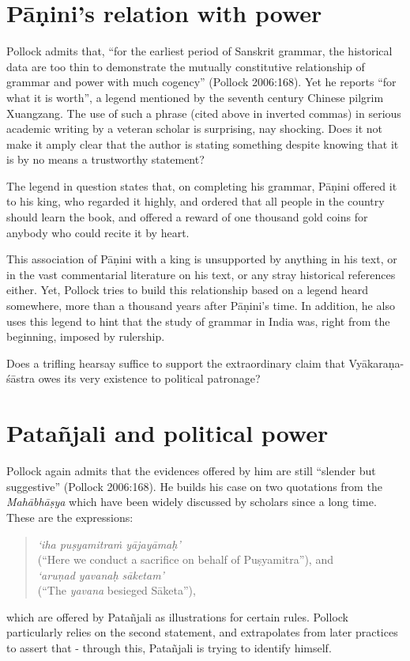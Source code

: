 \section{Pāṇini’s relation with power}\label{chap3-sec8}

Pollock admits that, ``for the earliest period of Sanskrit grammar, the historical data are too thin to demonstrate the mutually constitutive relationship of grammar and power with much cogency'' (Pollock 2006:168). Yet he reports ``for what it is worth'', a legend mentioned by the seventh century Chinese pilgrim Xuangzang. The use of such a phrase (cited above in inverted commas) in serious academic writing by a veteran scholar is surprising, nay shocking. Does it not make it amply clear that the author is stating something despite knowing that it is by no means a trustworthy statement? 

The legend in question states that, on completing his grammar, Pāṇini offered it to his king, who regarded it highly, and ordered that all people in the country should learn the book, and offered a reward of one thousand gold coins for anybody who could recite it by heart. 

This association of Pāṇini with a king is unsupported by anything in his text, or in the vast commentarial literature on his text, or any stray historical references either. Yet, Pollock tries to build this relationship based on a legend heard somewhere, more than a thousand years after Pāṇini's time. In addition, he also uses this legend to hint that the study of grammar in India was, right from the beginning, imposed by rulership. 

Does a trifling hearsay suffice to support the extraordinary claim that Vyākaraṇa-śāstra owes its very existence to political patronage?

\section{Patañjali and political power}\label{chap3-sec9}

Pollock again admits that the evidences offered by him are still ``slender but suggestive'' (Pollock 2006:168). He builds his case on two quotations from the {\sl Mahābhāṣya} which have been widely discussed by scholars since a long time. These are the expressions: 
\begin{quote}
{{\sl `iha puṣyamitraṁ yājayāmaḥ'}}\\
(``Here we conduct a sacrifice on behalf of Puṣyamitra''), and\\
{{\sl `aruṇad yavanaḥ sāketam'}}\\
(``The {\sl yavana} besieged Sāketa''),
\end{quote}
which are offered by Patañjali as illustrations for certain rules. Pollock particularly relies on the second statement, and extrapolates from later practices to assert that - through this, Patañjali is trying to identify himself.

